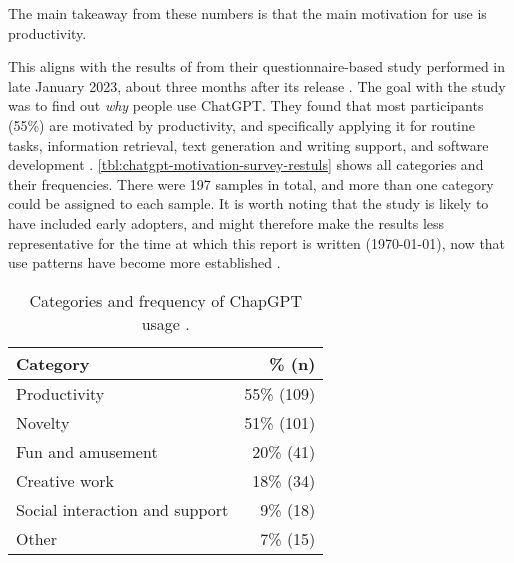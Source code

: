 The main takeaway from these numbers is that the main motivation for use is productivity.

This aligns with the results of \cite*{skjuveWhyPeopleUse2023} from their questionnaire-based study performed in late January 2023, about three months after its release \citep{openaiGPT4TechnicalReport2023}. The goal with the study was to find out \textit{why} people use ChatGPT. They found that most participants (55\%) are motivated by productivity, and specifically applying it for routine tasks, information retrieval, text generation and writing support, and software development \citep[17-21]{skjuveWhyPeopleUse2023}. \autoref{tbl:chatgpt-motivation-survey-restuls} shows all categories and their frequencies. There were 197 samples in total, and more than one category could be  assigned to each sample. It is worth noting that the study is likely to have included early adopters, and might therefore make the results less representative for the time at which this report is written (\today), now that use patterns have become more established \citep[37]{skjuveWhyPeopleUse2023}.

\begin{table}[ht]
    \centering
    \caption{Categories and frequency of ChapGPT usage \citep[16-17]{skjuveWhyPeopleUse2023}.}
    \label{tbl:chatgpt-motivation-survey-restuls}
    \begin{tabular}[t]{lr}
        \hline
        \textbf{Category}              & \% \textbf{(n)} \\
        \hline
        Productivity                   & 55\% (109)      \\
        Novelty                        & 51\% (101)      \\
        Fun and amusement              & 20\% (41)       \\
        Creative work                  & 18\% (34)       \\
        Social interaction and support & 9\% (18)        \\
        Other                          & 7\% (15)        \\
        \hline
    \end{tabular}
\end{table}

